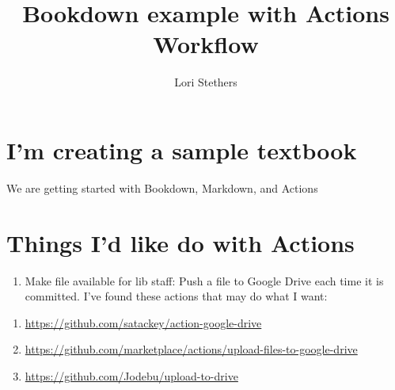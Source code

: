 \documentclass[
  openany]{book}
\title{Bookdown example with Actions Workflow}
\author{Lori Stethers}
\date{}
\providecommand{\tightlist}{%
  \setlength{\itemsep}{0pt}\setlength{\parskip}{0pt}}
\begin{document}
\maketitle

{
\setcounter{tocdepth}{1}
\tableofcontents
}
\hypertarget{im-creating-a-sample-textbook}{%
\chapter{I'm creating a sample textbook}\label{im-creating-a-sample-textbook}}

We are getting started with Bookdown, Markdown, and Actions

\hypertarget{things-id-like-do-with-actions}{%
\chapter{Things I'd like do with Actions}\label{things-id-like-do-with-actions}}

\begin{enumerate}
\def\labelenumi{\arabic{enumi}.}
\tightlist
\item
  Make file available for lib staff: Push a file to Google Drive each time it is committed. I've found these actions that may do what I want:
\end{enumerate}

\begin{enumerate}
\def\labelenumi{\alph{enumi}.}
\tightlist
\item
  \url{https://github.com/satackey/action-google-drive}
\item
  \url{https://github.com/marketplace/actions/upload-files-to-google-drive}
\item
  \url{https://github.com/Jodebu/upload-to-drive}
\end{enumerate}
\end{document}
